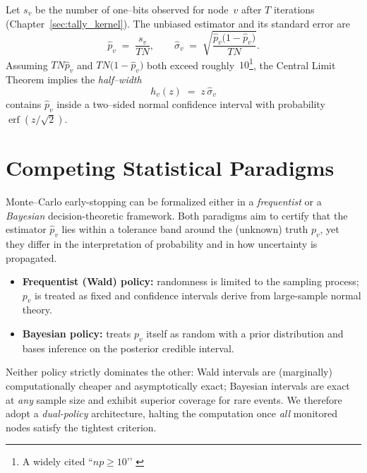 Let $s_v$ be the number of one--bits observed for node~$v$ after $T$ iterations
(Chapter~\ref{sec:tally_kernel}).  The unbiased estimator and its standard
error are
\begin{equation}
  \widehat{p}_v \;=\; \frac{s_v}{T N},
  \qquad
  \widehat{\sigma}_v \;=\;
  \sqrt{\frac{\widehat{p}_v\bigl(1-\widehat{p}_v\bigr)}{T N}}.
  \label{eq:p_hat_sigma_hat}
\end{equation}
Assuming $T N \widehat{p}_v$ and $T N\bigl(1-\widehat{p}_v\bigr)$ both exceed
roughly~$10$\cite{AgrestiCoull1998}\footnote{A widely cited “$np\ge10$’’\cite{AgrestiCoull1998} \cite{BrownCaiDasGupta2001}}, the Central Limit Theorem implies the \emph{half--width}
\begin{equation}
  h_v(z) \;=\; z\,\widehat{\sigma}_v
  \label{eq:half_width}
\end{equation}
contains $\widehat{p}_v$ inside a two--sided normal confidence interval with
probability $\operatorname{erf}(z/\sqrt{2})$.

\section{Competing Statistical Paradigms}
\label{subsec:conv_paradigms}

Monte--Carlo early-stopping can be formalized either in a
\emph{frequentist} or a \emph{Bayesian} decision-theoretic framework.
Both paradigms aim to certify that the estimator $\widehat{p}_v$ lies within a tolerance band around the (unknown) truth $p_v$, yet they differ in the interpretation of probability and in how uncertainty is propagated.

\begin{itemize}
  \item \textbf{Frequentist (Wald) policy:} randomness is limited to the sampling process; $p_v$ is treated as fixed and confidence intervals derive from large-sample normal theory.
  \item \textbf{Bayesian policy:} treats $p_v$ itself as random with a prior distribution and bases inference on the posterior credible interval.
\end{itemize}

Neither policy strictly dominates the other: Wald intervals are (marginally) computationally cheaper and asymptotically exact; Bayesian intervals are exact at \emph{any} sample size and exhibit superior coverage for rare events. We therefore adopt a \emph{dual-policy} architecture, halting the computation once \emph{all} monitored nodes satisfy the tightest criterion.

